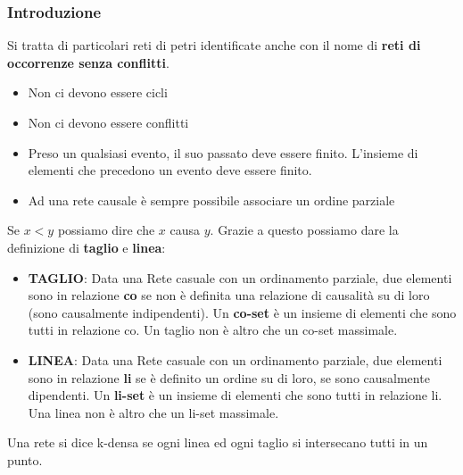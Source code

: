 \subsubsection{Introduzione}
Si tratta di particolari reti di petri identificate anche con il nome di \textbf{reti di occorrenze senza conflitti}.
\begin{itemize}
    \item Non ci devono essere cicli
    \item Non ci devono essere conflitti
    \item Preso un qualsiasi evento, il suo passato deve essere finito. L’insieme di elementi che
precedono un evento deve essere finito.
    \item Ad una rete causale è sempre possibile associare un ordine parziale
\end{itemize}
Se $x < y$ possiamo dire che $x$ causa $y$. Grazie a questo possiamo dare la definizione di \textbf{taglio} e \textbf{linea}:
\begin{itemize}
    \item \textbf{TAGLIO}: Data una Rete casuale con un ordinamento parziale, due elementi sono in relazione
\textbf{co} se non è definita una relazione di causalità su di loro (sono causalmente indipendenti). Un
\textbf{co-set} è un insieme di elementi che sono tutti in relazione co. Un taglio non è altro che un co-set massimale.
    \item \textbf{LINEA}: Data una Rete casuale con un ordinamento parziale, due elementi sono in relazione \textbf{li}
se è definito un ordine su di loro, se sono causalmente dipendenti. Un \textbf{li-set} è un insieme di
elementi che sono tutti in relazione li. Una linea non è altro che un li-set massimale.
\end{itemize}
Una rete si dice k-densa se ogni linea ed ogni taglio si intersecano tutti in un punto.
